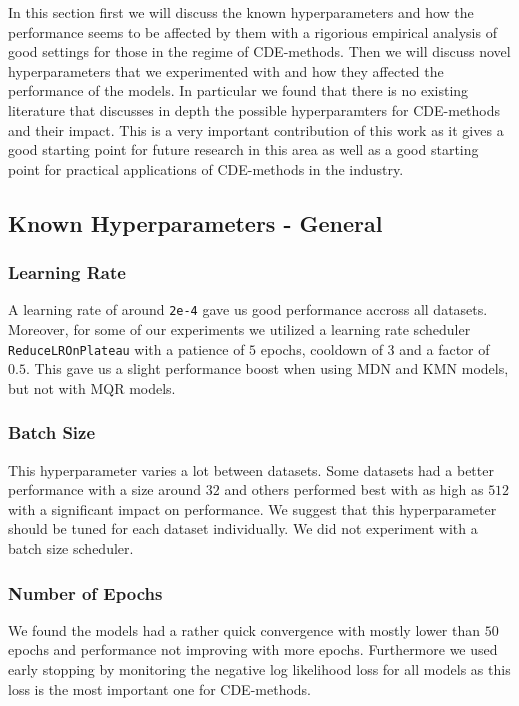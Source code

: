 In this section first we will discuss the known hyperparameters and how the performance seems to be affected by them with a rigorious empirical analysis of good settings for those in the regime of CDE-methods. Then we will discuss novel hyperparameters that we experimented with and how they affected the performance of the models. In particular we found that there is no existing literature that discusses in depth the possible hyperparamters for CDE-methods and their impact. This is a very important contribution of this work as it gives a good starting point for future research in this area as well as a good starting point for practical applications of CDE-methods in the industry.

\subsection{Known Hyperparameters - General}

\subsubsection{Learning Rate}

A learning rate of around \texttt{2e-4} gave us good performance accross all datasets. Moreover, for some of our experiments we utilized a learning rate scheduler \texttt{ReduceLROnPlateau} with a patience of $5$ epochs, cooldown of $3$ and a factor of $0.5$. This gave us a slight performance boost when using MDN and KMN models, but not with MQR models.

\subsubsection{Batch Size}

This hyperparameter varies a lot between datasets. Some datasets had a better performance with a size around $32$ and others performed best with as high as $512$ with a significant impact on performance. We suggest that this hyperparameter should be tuned for each dataset individually. We did not experiment with a batch size scheduler.

\subsubsection{Number of Epochs}

We found the models had a rather quick convergence with mostly lower than $50$ epochs and performance not improving with more epochs. Furthermore we used early stopping by monitoring the negative log likelihood loss for all models as this loss is the most important one for CDE-methods.

